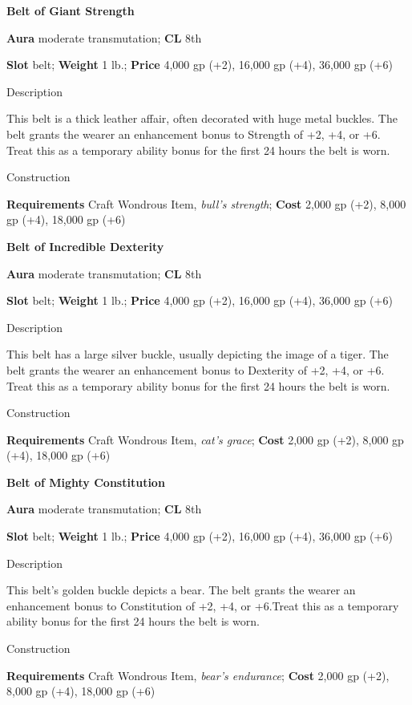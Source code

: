 \textbf{Belt of Giant Strength}
				
\textbf{Aura} moderate transmutation; \textbf{CL} 8th
				
\textbf{Slot }belt; \textbf{Weight} 1 lb.; \textbf{Price} 4,000 gp (+2), 16,000 gp (+4), 36,000 gp (+6)
				
Description
				
This belt is a thick leather affair, often decorated with huge metal buckles. The belt grants the wearer an enhancement bonus to Strength of +2, +4, or +6. Treat this as a temporary ability bonus for the first 24 hours the belt is worn.
				
Construction
				
\textbf{Requirements }Craft Wondrous Item, \textit{bull's strength}; \textbf{Cost} 2,000 gp (+2), 8,000 gp (+4), 18,000 gp (+6)
				
\textbf{Belt of Incredible Dexterity}
				
\textbf{Aura} moderate transmutation; \textbf{CL} 8th
				
\textbf{Slot }belt; \textbf{Weight} 1 lb.; \textbf{Price} 4,000 gp (+2), 16,000 gp (+4), 36,000 gp (+6)
				
Description
				
This belt has a large silver buckle, usually depicting the image of a tiger. The belt grants the wearer an enhancement bonus to Dexterity of +2, +4, or +6. Treat this as a temporary ability bonus for the first 24 hours the belt is worn.
				
Construction
				
\textbf{Requirements }Craft Wondrous Item, \textit{cat's grace}; \textbf{Cost} 2,000 gp (+2), 8,000 gp (+4), 18,000 gp (+6)
				
\textbf{Belt of Mighty Constitution}
				
\textbf{Aura} moderate transmutation; \textbf{CL} 8th
				
\textbf{Slot }belt; \textbf{Weight} 1 lb.; \textbf{Price} 4,000 gp (+2), 16,000 gp (+4), 36,000 gp (+6)
				
Description
				
This belt's golden buckle depicts a bear. The belt grants the wearer an enhancement bonus to Constitution of +2, +4, or +6.Treat this as a temporary ability bonus for the first 24 hours the belt is worn.
				
Construction
				
\textbf{Requirements }Craft Wondrous Item, \textit{bear's endurance}; \textbf{Cost} 2,000 gp (+2), 8,000 gp (+4), 18,000 gp (+6)
				

